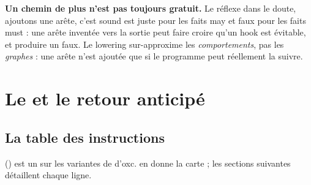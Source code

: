 \begin{piege}
\textbf{Un chemin de plus n'est pas toujours gratuit.} Le réflexe \og dans le doute, ajoutons une arête, c'est sound\fg{} est juste pour les faits may et faux pour les faits must : une arête inventée vers la sortie peut faire croire qu'un hook est évitable, et produire un \Error{} faux. Le lowering sur-approxime les \emph{comportements}, pas les \emph{graphes} : une arête n'est ajoutée que si le programme peut réellement la suivre.
\end{piege}

\section{Le  et le retour anticipé}
\label{sec:lowering-if}

\subsection{La table des instructions}

 () est un  sur les variantes de  d'oxc.  en donne la carte ; les sections suivantes détaillent chaque ligne.

